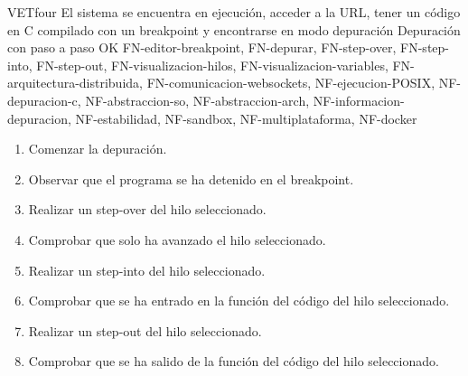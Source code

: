     \begin{testCase}{VET}{four}
        {El sistema se encuentra en ejecución, acceder a la URL, tener un código en C compilado con un breakpoint y encontrarse en modo depuración}
        {\NA}
        {Depuración con paso a paso}
        {OK}
        {FN-editor-breakpoint, FN-depurar, FN-step-over, FN-step-into, FN-step-out, FN-visualizacion-hilos, FN-visualizacion-variables, FN-arquitectura-distribuida, FN-comunicacion-websockets, NF-ejecucion-POSIX, NF-depuracion-c, NF-abstraccion-so, NF-abstraccion-arch, NF-informacion-depuracion, NF-estabilidad, NF-sandbox, NF-multiplataforma, NF-docker}

        \begin{enumerate}
            \item Comenzar la depuración.
            \item Observar que el programa se ha detenido en el breakpoint.
            \item Realizar un step-over del hilo seleccionado.
            \item Comprobar que solo ha avanzado el hilo seleccionado.
            \item Realizar un step-into del hilo seleccionado.
            \item Comprobar que se ha entrado en la función del código del hilo seleccionado.
            \item Realizar un step-out del hilo seleccionado.
            \item Comprobar que se ha salido de la función del código del hilo seleccionado.
        \end{enumerate}
    \end{testCase}

